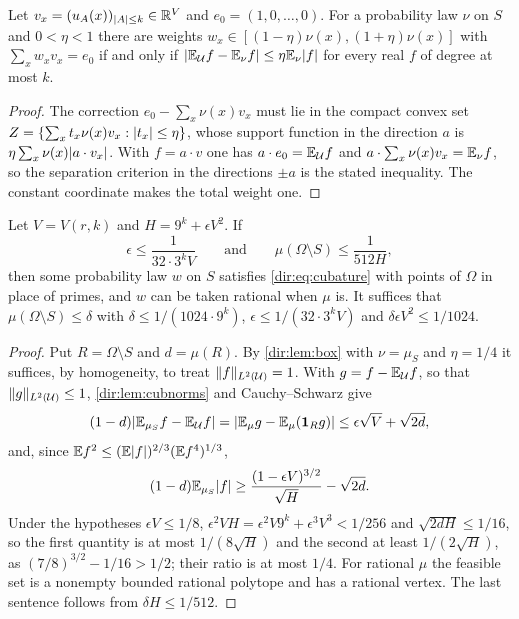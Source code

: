\begin{lemma}\label{dir:lem:box}
Let $v_x=(u_A(x))_{\lvert A\rvert\le k}\in\mathbb{R}^{V}$ and $e_0=(1,0,\dots,0)$. For a probability law $\nu$ on $S$ and
$0<\eta<1$ there are weights $w_x\in[(1-\eta)\nu(x),(1+\eta)\nu(x)]$ with $\sum_xw_xv_x=e_0$ if and only if
$\lvert\mathbb{E}_{\mathcal U}f-\mathbb{E}_\nu f\rvert\le\eta\mathbb{E}_\nu\lvert f\rvert$ for every real $f$ of degree at most $k$.
\end{lemma}

\begin{proof}
The correction $e_0-\sum_x\nu(x)v_x$ must lie in the compact convex set
$Z=\{\sum_xt_x\nu(x)v_x:\lvert t_x\rvert\le\eta\}$, whose support function in the direction $a$ is
$\eta\sum_x\nu(x)\lvert a\cdot v_x\rvert$. With $f=a\cdot v$ one has $a\cdot e_0=\mathbb{E}_{\mathcal U}f$ and
$a\cdot\sum_x\nu(x)v_x=\mathbb{E}_\nu f$, so the separation criterion in the directions $\pm a$ is the stated
inequality. The constant coordinate makes the total weight one.
\end{proof}

\begin{theorem}\label{dir:thm:cubrepair}
Let $V=V(r,k)$ and $H=9^k+\epsilon V^2$. If
\[
 \epsilon\le\frac1{32\cdot3^kV}\qquad\text{and}\qquad\mu(\Omega\setminus S)\le\frac1{512H},
\]
then some probability law $w$ on $S$ satisfies \eqref{dir:eq:cubature} with points of $\Omega$ in place of
primes, and $w$ can be taken rational when $\mu$ is. It suffices that
$\mu(\Omega\setminus S)\le\delta$ with $\delta\le1/(1024\cdot9^k)$, $\epsilon\le1/(32\cdot3^kV)$ and
$\delta\epsilon V^2\le1/1024$.
\end{theorem}

\begin{proof}
Put $R=\Omega\setminus S$ and $d=\mu(R)$. By \cref{dir:lem:box} with $\nu=\mu_S$ and $\eta=1/4$ it suffices,
by homogeneity, to treat $\lVert f\rVert_{L^2(\mathcal U)}=1$. With $g=f-\mathbb{E}_{\mathcal U}f$, so that
$\lVert g\rVert_{L^2(\mathcal U)}\le1$, \cref{dir:lem:cubnorms} and Cauchy--Schwarz give
\[
 (1-d)\lvert\mathbb{E}_{\mu_S}f-\mathbb{E}_{\mathcal U}f\rvert=\lvert\mathbb{E}_\mu g-\mathbb{E}_\mu(\mathbf 1_Rg)\rvert\le\epsilon\sqrt V+\sqrt{2d},
\]
and, since $\mathbb{E} f^2\le(\mathbb{E}\lvert f\rvert)^{2/3}(\mathbb{E} f^4)^{1/3}$,
\[
 (1-d)\mathbb{E}_{\mu_S}\lvert f\rvert\ge\frac{(1-\epsilon V)^{3/2}}{\sqrt H}-\sqrt{2d}.
\]
Under the hypotheses $\epsilon V\le1/8$, $\epsilon^2VH=\epsilon^2V9^k+\epsilon^3V^3<1/256$ and
$\sqrt{2dH}\le1/16$, so the first quantity is at most $1/(8\sqrt H)$ and the second at least $1/(2\sqrt H)$, as
$(7/8)^{3/2}-1/16>1/2$; their ratio is at most $1/4$. For rational $\mu$ the feasible set is a nonempty
bounded rational polytope and has a rational vertex. The last sentence follows from $\delta H\le1/512$.
\end{proof}

